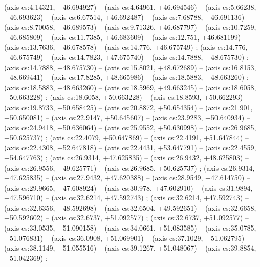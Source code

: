     (axis cs:4.14321,    +46.694927) --  (axis cs:4.64961,    +46.694546) --  (axis cs:5.66238,    +46.693623) --  (axis cs:6.67514,    +46.692487) --  (axis cs:7.68788,    +46.691136) --  (axis cs:8.70058,    +46.689573) --  (axis cs:9.71326,    +46.687797) --  (axis cs:10.7259,    +46.685809) --  (axis cs:11.7385,    +46.683609) --  (axis cs:12.751,    +46.681199) --  (axis cs:13.7636,    +46.678578) --  (axis cs:14.776,    +46.675749) ;
    (axis cs:14.776,    +46.675749) --  (axis cs:14.7823,    +47.675740) --  (axis cs:14.7888,    +48.675730) ;
    (axis cs:14.7888,    +48.675730) --  (axis cs:15.8021,    +48.672689) --  (axis cs:16.8153,    +48.669441) --  (axis cs:17.8285,    +48.665986) --  (axis cs:18.5883,    +48.663260) ;
    (axis cs:18.5883,    +48.663260) --  (axis cs:18.5969,    +49.663245) --  (axis cs:18.6058,    +50.663228) ;
    (axis cs:18.6058,    +50.663228) --  (axis cs:18.8593,    +50.662293) --  (axis cs:19.8733,    +50.658425) --  (axis cs:20.8872,    +50.654354) --  (axis cs:21.901,    +50.650081) --  (axis cs:22.9147,    +50.645607) --  (axis cs:23.9283,    +50.640934) --  (axis cs:24.9418,    +50.636064) --  (axis cs:25.9552,    +50.630998) --  (axis cs:26.9685,    +50.625737) ;
    (axis cs:22.4079,    +50.647869) --  (axis cs:22.4191,    +51.647844) --  (axis cs:22.4308,    +52.647818) --  (axis cs:22.4431,    +53.647791) --  (axis cs:22.4559,    +54.647763) ;
    (axis cs:26.9314,    +47.625835) --  (axis cs:26.9432,    +48.625803) --  (axis cs:26.9556,    +49.625771) --  (axis cs:26.9685,    +50.625737) ;
    (axis cs:26.9314,    +47.625835) --  (axis cs:27.9432,    +47.620388) --  (axis cs:28.9549,    +47.614750) --  (axis cs:29.9665,    +47.608924) --  (axis cs:30.978,    +47.602910) --  (axis cs:31.9894,    +47.596710) --  (axis cs:32.6214,    +47.592743) ;
    (axis cs:32.6214,    +47.592743) --  (axis cs:32.6356,    +48.592698) --  (axis cs:32.6504,    +49.592651) --  (axis cs:32.6658,    +50.592602) --  (axis cs:32.6737,    +51.092577) ;
    (axis cs:32.6737,    +51.092577) --  (axis cs:33.0535,    +51.090158) --  (axis cs:34.0661,    +51.083585) --  (axis cs:35.0785,    +51.076831) --  (axis cs:36.0908,    +51.069901) --  (axis cs:37.1029,    +51.062795) --  (axis cs:38.1149,    +51.055516) --  (axis cs:39.1267,    +51.048067) --  (axis cs:39.8854,    +51.042369) ;
